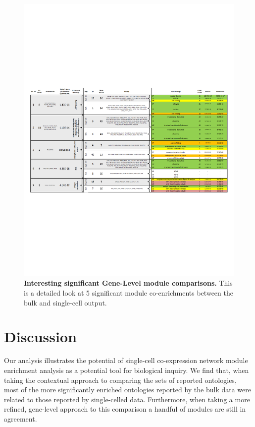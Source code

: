 \documentclass[10pt,letterpaper]{article}
\begin{document}
\begin{figure}
\centering
\includegraphics[width=180mm]{Figures/PopVsSCGeneLevel}
\caption{\textbf{Interesting significant Gene-Level module comparisons.} This is a detailed look at 5 significant module co-enrichments between the bulk and single-cell output.}
\label{fig:geneLevelChart}
\end{figure}

\section*{Discussion}

Our analysis illustrates the potential of single-cell co-expression network module enrichment analysis as a potential tool for biological inquiry. We find that, when taking the contextual approach to comparing the sets of reported ontologies, most of the more significantly enriched ontologies reported by the bulk data were related to those reported by single-celled data. Furthermore, when taking a more refined, gene-level approach to this comparison a handful of modules are still in agreement.
\end{document}
